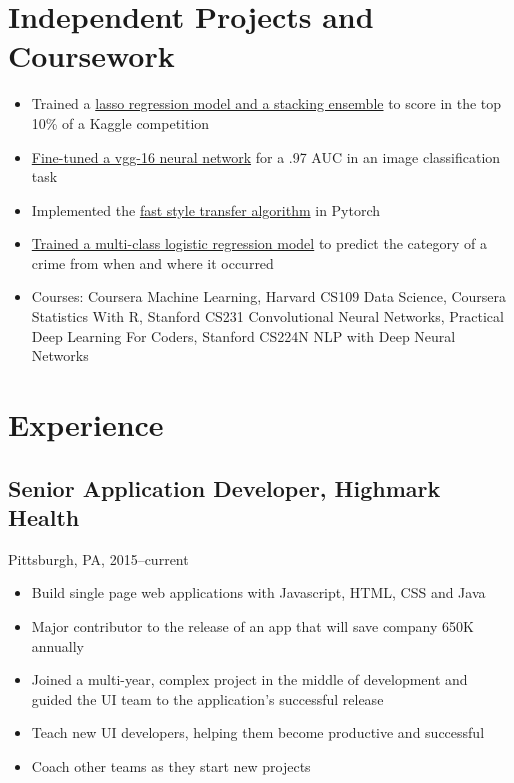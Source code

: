 \documentclass[11pt]{article}
\begin{document}
	\section{Independent Projects and Coursework}
		\begin{itemize}
			\item Trained a \href{https://github.com/ryankresse/ames_housing}{lasso regression model and a stacking ensemble} to score in the top 10\% of a Kaggle competition
			\item \href{https://github.com/ryankresse/invasive_species}{Fine-tuned a vgg-16 neural network} for a .97 AUC in an image classification task 
			\item Implemented the \href{https://github.com/ryankresse/fast_style_transfer_pytorch}{fast style transfer algorithm} in Pytorch
			\item \href{https://github.com/ryankresse/sf-crime}{Trained a multi-class logistic regression model} to predict the category of a crime from when and where it occurred
			\item Courses: Coursera Machine Learning, Harvard CS109 Data Science, Coursera Statistics With R, Stanford CS231 Convolutional Neural Networks, Practical Deep Learning For Coders, Stanford CS224N NLP with Deep Neural Networks
		\end{itemize}
		
	\section{Experience}
			\subsection{\normalsize{Senior Application Developer, Highmark Health}}
			{\fontsize{10pt}{\parskip}\selectfont Pittsburgh, PA, 2015--current}
		\begin{itemize}
		\item Build single page web applications with Javascript, HTML, CSS and Java
		\item Major contributor to the release of an app that will save company 650K annually
		\item Joined a multi-year, complex project in the middle of development and guided the UI team to the application's successful release
		\item Teach new UI developers, helping them become productive and successful
		\item Coach other teams as they start new projects
		\end{itemize}
		
\end{document}
